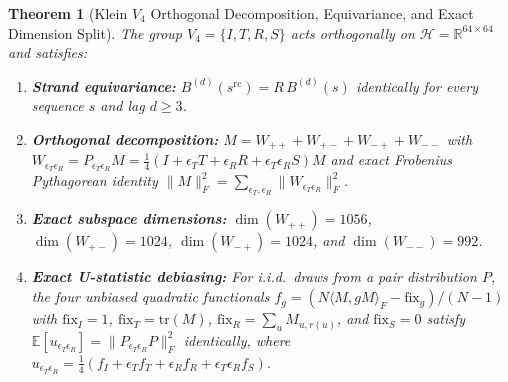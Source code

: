 \documentclass[11pt,a4paper]{article}
\renewcommand{\_}{\origunderscore\penalty200\relax}
\newtheorem{theorem}{Theorem}[section]
\theoremstyle{remark}
\begin{document}
\begin{theorem}[Klein $V_4$ Orthogonal Decomposition, Equivariance, and Exact Dimension Split]
\label{thm:V4}
The group $V_4 = \{I, T, R, S\}$ acts orthogonally on $\mathcal{H} = \mathbb{R}^{64\times 64}$ and satisfies:
\begin{enumerate}
  \item \textbf{Strand equivariance:} $B^{(d)}(s^{\mathrm{rc}}) = R\,B^{(d)}(s)$ identically for every sequence $s$ and lag $d \ge 3$.
  \item \textbf{Orthogonal decomposition:} $M = W_{++} + W_{+-} + W_{-+} + W_{--}$ with $W_{\epsilon_T\epsilon_R} = P_{\epsilon_T\epsilon_R} M = \frac{1}{4}(I + \epsilon_T T + \epsilon_R R + \epsilon_T\epsilon_R S)M$ and exact Frobenius Pythagorean identity $\|M\|_F^2 = \sum_{\epsilon_T,\epsilon_R} \|W_{\epsilon_T\epsilon_R}\|_F^2$.
  \item \textbf{Exact subspace dimensions:} $\dim(W_{++}) = 1056$, $\dim(W_{+-}) = 1024$, $\dim(W_{-+}) = 1024$, and $\dim(W_{--}) = 992$.
  \item \textbf{Exact U-statistic debiasing:} For i.i.d.\ draws from a pair distribution $P$, the four unbiased quadratic functionals $f_g = (N\langle M, gM\rangle_F - \mathrm{fix}_g)/(N-1)$ with $\mathrm{fix}_I = 1$, $\mathrm{fix}_T = \mathrm{tr}(M)$, $\mathrm{fix}_R = \sum_u M_{u,r(u)}$, and $\mathrm{fix}_S = 0$ satisfy $\mathbb{E}[u_{\epsilon_T\epsilon_R}] = \|P_{\epsilon_T\epsilon_R} P\|_F^2$ identically, where $u_{\epsilon_T\epsilon_R} = \frac{1}{4}(f_I + \epsilon_T f_T + \epsilon_R f_R + \epsilon_T\epsilon_R f_S)$.
\end{enumerate}
\end{theorem}
\end{document}
